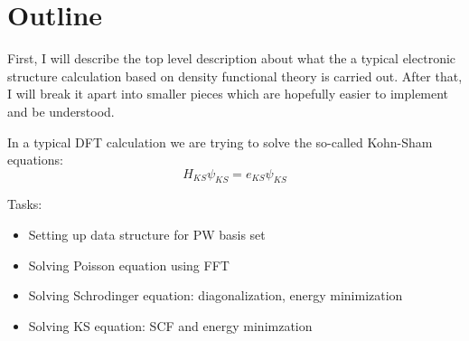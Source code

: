 \section{Outline}

First, I will describe the top level description about what
the a typical electronic structure calculation based on density functional
theory is carried out. After that, I will break it apart into
smaller pieces which are hopefully easier to implement and be understood.

In a typical DFT calculation we are trying to solve the so-called Kohn-Sham
equations:
\begin{equation}
H_{KS} \psi_{KS} = e_{KS} \psi_{KS}
\end{equation}

Tasks:
\begin{itemize}
\item Setting up data structure for PW basis set
\item Solving Poisson equation using FFT
\item Solving Schrodinger equation: diagonalization, energy minimization
\item Solving KS equation: SCF and energy minimzation
\end{itemize}

